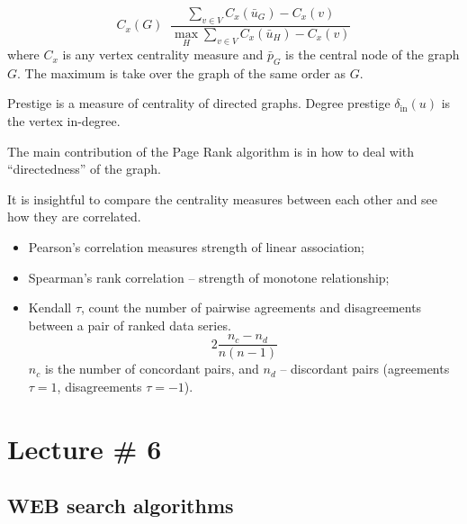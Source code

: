 \documentclass[a4paper]{article}
\newcommand{\defn}{\mathop{\overset{\Delta}{=}}\nolimits}
\begin{document}
\[C_x(G) \defn \frac{\sum_{v\in V} C_x(\bar{u}_G) - C_x(v) }{\max_H \sum_{v\in V} C_x(\bar{u}_H) - C_x(v)}\]
where $C_x$ is any vertex centrality measure and $\bar{p}_G$ is the central node of the graph $G$. The maximum is take over the graph of the same order as $G$.

Prestige is a measure of centrality of directed graphs.
Degree prestige $\delta_{\text{in}}(u)$ is the vertex in-degree.

The main contribution of the Page Rank algorithm is in how to deal with ``directedness'' of the graph.

It is insightful to compare the centrality measures between each other and see how they are correlated.
\begin{itemize}
	\item Pearson's correlation measures strength of linear association;
	\item Spearman's rank correlation -- strength of monotone relationship;
	\item Kendall $\tau$, count the number of pairwise agreements and disagreements between a pair of ranked data series. 
	\[2\frac{n_c - n_d}{n(n-1)}\]
	$n_c$ is the number of concordant pairs, and $n_d$ -- discordant pairs (agreements $\tau=1$, disagreements $\tau=-1$).
\end{itemize}


\section{Lecture \# 6} %
\label{sec:lecture_6}

\subsection{WEB search algorithms} %
\label{sub:web_search_algorithms}




\end{document}
